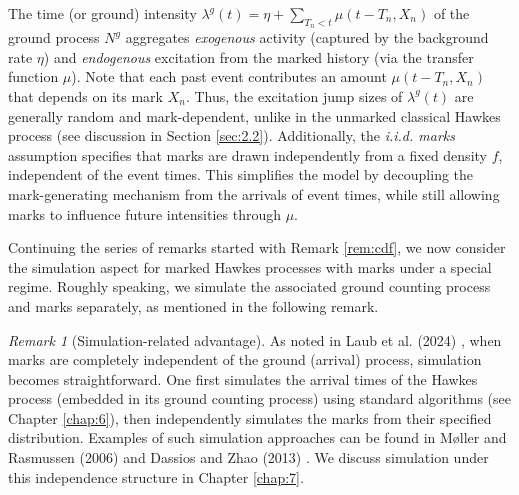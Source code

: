 \documentclass[12pt,a4paper]{report}
\theoremstyle{plain}
\theoremstyle{definition}
\theoremstyle{remark}
\newtheorem{remark}{Remark}[section]
\newcommand{\1}{\mathbf{1}}
\begin{document}
\medskip
\noindent
The time (or ground) intensity $\lambda^g(t) = \eta + \sum_{T_n < t} \mu(t - T_n, X_n)$ of the ground process $N^g$ aggregates \emph{exogenous} activity (captured by the background rate $\eta$) and \emph{endogenous} excitation from the marked history (via the transfer function $\mu$). Note that each past event contributes an amount $\mu(t-T_n, X_n)$ that depends on its mark $X_n$. Thus, the excitation jump sizes of $\lambda^g(t)$ are generally random and mark-dependent, unlike in the unmarked classical Hawkes process (see discussion in Section \ref{sec:2.2}).
Additionally, the \emph{i.i.d. marks} assumption specifies that marks are drawn independently from a fixed density $f$, independent of the event times. This simplifies the model by decoupling the mark-generating mechanism from the arrivals of event times, while still allowing marks to influence future intensities through $\mu$.

\medskip
\noindent
Continuing the series of remarks started with Remark \ref{rem:cdf}, we now consider the simulation aspect for marked Hawkes processes with marks under a special regime. Roughly speaking, we simulate the associated ground counting process and marks separately, as mentioned in the following remark.
\begin{remark}[Simulation-related advantage]\label{rem:iid-simulation}
\medskip
\noindent
As noted in Laub et al. (2024) \cite{LLPT24}, when marks are completely independent of the ground (arrival) process, simulation becomes straightforward. One first simulates the arrival times of the Hawkes process (embedded in its ground counting process) using standard algorithms (see Chapter \ref{chap:6}), then independently simulates the marks from their specified distribution. Examples of such simulation approaches can be found in Møller and Rasmussen (2006) \cite{MR06} and Dassios and Zhao (2013) \cite{DZ13}. We discuss simulation under this independence structure in Chapter \ref{chap:7}.
\end{remark}
\end{document}
